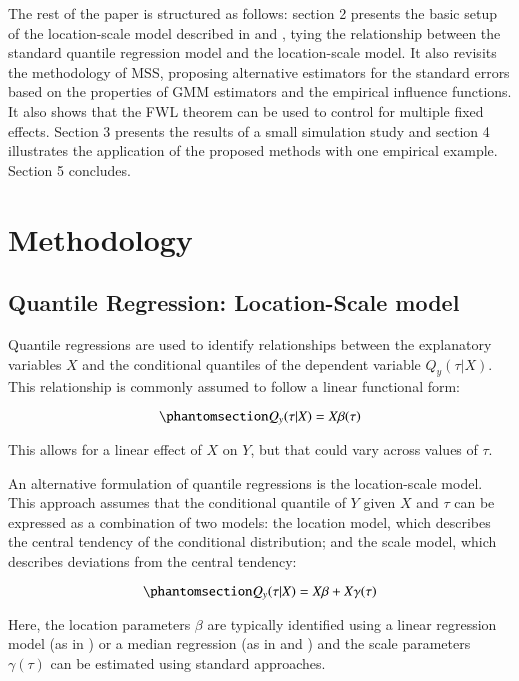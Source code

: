 \documentclass[
  authoryear,
  review,
  1p]{elsarticle}
\begin{document}
The rest of the paper is structured as follows: section 2 presents the
basic setup of the location-scale model described in \citet{he1997} and
\citet{zhao2000}, tying the relationship between the standard quantile
regression model and the location-scale model. It also revisits the
methodology of MSS, proposing alternative estimators for the standard
errors based on the properties of GMM estimators and the empirical
influence functions. It also shows that the FWL theorem can be used to
control for multiple fixed effects. Section 3 presents the results of a
small simulation study and section 4 illustrates the application of the
proposed methods with one empirical example. Section 5 concludes.

\section{Methodology}\label{sec-method}

\subsection{Quantile Regression: Location-Scale model}\label{sec-betas}

Quantile regressions are used to identify relationships between the
explanatory variables \(X\) and the conditional quantiles of the
dependent variable \(Q_y(\tau|X)\). This relationship is commonly
assumed to follow a linear functional form:

\begin{equation}\phantomsection\label{eq-eq1}{Q_y(\tau|X) =X\beta(\tau)
}\end{equation}

This allows for a linear effect of \(X\) on \(Y\), but that could vary
across values of \(\tau\).

An alternative formulation of quantile regressions is the location-scale
model. This approach assumes that the conditional quantile of \(Y\)
given \(X\) and \(\tau\) can be expressed as a combination of two
models: the location model, which describes the central tendency of the
conditional distribution; and the scale model, which describes
deviations from the central tendency:

\begin{equation}\phantomsection\label{eq-eq2}{Q_y(\tau|X) =X\beta+X\gamma(\tau)
}\end{equation}

Here, the location parameters \(\beta\) are typically identified using a
linear regression model (as in \citet{mss2019}) or a median regression
(as in \citet{he1997} and \citet{zhao2000}) and the scale parameters
\(\gamma(\tau)\) can be estimated using standard approaches.
\end{document}
